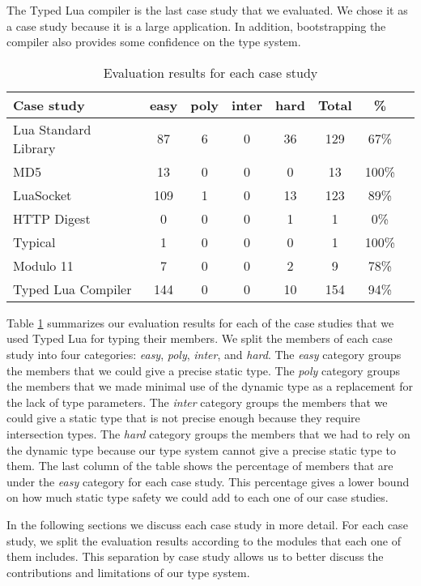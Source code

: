 The Typed Lua compiler is the last case study that we evaluated.
We chose it as a case study because it is a large application.
In addition, bootstrapping the compiler also provides some
confidence on the type system.

\begin{table}[!ht]
\begin{center}
\begin{tabular}{|l|c|c|c|c|c|c|c|}
\hline
\textbf{Case study} & \textbf{easy} & \textbf{poly} & \textbf{inter} & \textbf{hard} & \textbf{Total} & \textbf{\%} \\
\hline
Lua Standard Library & 87 & 6 & 0 & 36 & 129 & 67\% \\
\hline
MD5 & 13 & 0 & 0 & 0 & 13 & 100\% \\
\hline
LuaSocket & 109 & 1 & 0 & 13 & 123 & 89\% \\
\hline
HTTP Digest & 0 & 0 & 0 & 1 & 1 & 0\% \\
\hline
Typical & 1 & 0 & 0 & 0 & 1 & 100\% \\
\hline
Modulo 11 & 7 & 0 & 0 & 2 & 9 & 78\% \\
\hline
Typed Lua Compiler & 144 & 0 & 0 & 10 & 154 & 94\% \\
\hline
\end{tabular}
\end{center}
\caption{Evaluation results for each case study}
\label{tab:evalbycase}
\end{table}

Table \ref{tab:evalbycase} summarizes our evaluation results for each
of the case studies that we used Typed Lua for typing their members.
We split the members of each case study into four categories:
\emph{easy}, \emph{poly}, \emph{inter}, and \emph{hard}.
The \emph{easy} category groups the members that we could give
a precise static type.
The \emph{poly} category groups the members that we made minimal
use of the dynamic type as a replacement for the lack of type parameters.
The \emph{inter} category groups the members that we could give
a static type that is not precise enough because they require
intersection types.
The \emph{hard} category groups the members that we had to rely
on the dynamic type because our type system cannot give a precise
static type to them.
The last column of the table shows the percentage of members that
are under the \emph{easy} category for each case study.
This percentage gives a lower bound on how much static type safety
we could add to each one of our case studies.

In the following sections we discuss each case study in more detail.
For each case study, we split the evaluation results according
to the modules that each one of them includes.
This separation by case study allows us to better discuss the
contributions and limitations of our type system.

